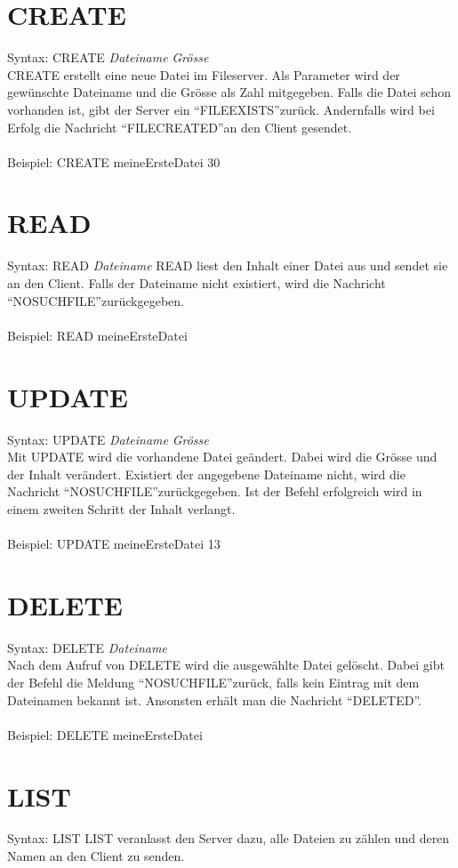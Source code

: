 \documentclass[12pt,a4paper,ngerman]{report}
\begin{document}
\section{CREATE}
Syntax: CREATE \textit{Dateiname} \textit{Grösse} \\
CREATE erstellt eine neue Datei im Fileserver. Als Parameter wird der gewünschte Dateiname und die Grösse als Zahl mitgegeben. Falls die Datei schon vorhanden ist, gibt der Server ein \textquotedblleft FILEEXISTS\textquotedblright zurück. Andernfalls wird bei Erfolg die Nachricht \textquotedblleft FILECREATED\textquotedblright an den Client gesendet.\\
\\
Beispiel: CREATE meineErsteDatei 30
\section{READ}
Syntax: READ \textit{Dateiname}
READ liest den Inhalt einer Datei aus und sendet sie an den Client. Falls der Dateiname nicht existiert, wird die Nachricht \textquotedblleft NOSUCHFILE\textquotedblright zurückgegeben.\\
\\
Beispiel: READ meineErsteDatei
\section{UPDATE}
Syntax: UPDATE \textit{Dateiname} \textit{Grösse}\\
Mit UPDATE wird die vorhandene Datei geändert. Dabei wird die Grösse und der Inhalt verändert. Existiert der angegebene Dateiname nicht, wird die Nachricht \textquotedblleft NOSUCHFILE\textquotedblright zurückgegeben. Ist der Befehl erfolgreich wird in einem zweiten Schritt der Inhalt verlangt.\\
\\
Beispiel: UPDATE meineErsteDatei 13
\section{DELETE}
Syntax: DELETE \textit{Dateiname}\\
Nach dem Aufruf von DELETE wird die ausgewählte Datei gelöscht. Dabei gibt der Befehl die Meldung \textquotedblleft NOSUCHFILE\textquotedblright zurück, falls kein Eintrag mit dem Dateinamen bekannt ist. Ansonsten erhält man die Nachricht \textquotedblleft DELETED\textquotedblright . \\
\\
Beispiel: DELETE meineErsteDatei
\section{LIST}
Syntax: LIST
LIST veranlasst den Server dazu, alle Dateien zu zählen und deren Namen an den Client zu senden.
\end{document}
